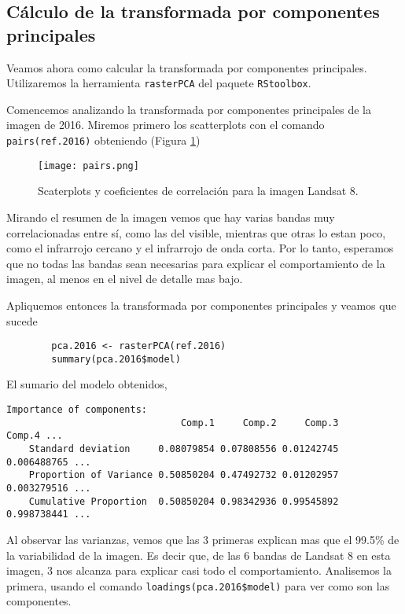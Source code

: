 \subsection{C\'alculo de la transformada por componentes principales}

Veamos ahora como calcular la transformada por componentes principales. Utilizaremos la
herramienta \texttt{rasterPCA} del paquete \texttt{RStoolbox}.

\begin{exa}
    Comencemos analizando la transformada por componentes principales de la
    imagen de 2016. Miremos primero los scatterplots con el comando \texttt{pairs(ref.2016)}
    obteniendo (Figura \ref{fig:pairs2})
    \begin{figure}[h!]
    \begin{center}
        \texttt{[image: pairs.png]}
    \end{center}
    \caption{Scaterplots y coeficientes de correlaci\'on para la imagen Landsat 8.}
    \label{fig:pairs2}
    \end{figure}

    Mirando el resumen de la imagen vemos que hay varias bandas muy
    correlacionadas entre s\'i, como las del visible, mientras que otras lo
    estan poco, como el infrarrojo cercano y el infrarrojo de onda corta. Por lo tanto, esperamos que no
    todas las bandas sean necesarias para explicar el comportamiento de la
    imagen, al menos en el nivel de detalle mas bajo.

    Apliquemos entonces la transformada por componentes principales y veamos que
    sucede

    \begin{lstlisting}
        pca.2016 <- rasterPCA(ref.2016)
        summary(pca.2016$model)
    \end{lstlisting}

    El sumario del modelo obtenidos,
    \begin{Verbatim}[fontsize=\small]
    Importance of components:
                               Comp.1     Comp.2     Comp.3      Comp.4 ...
    Standard deviation     0.08079854 0.07808556 0.01242745 0.006488765 ...
    Proportion of Variance 0.50850204 0.47492732 0.01202957 0.003279516 ...
    Cumulative Proportion  0.50850204 0.98342936 0.99545892 0.998738441 ...
    \end{Verbatim}

    Al observar las varianzas, vemos que las 3 primeras explican mas que el
    99.5\% de la variabilidad de la imagen. Es decir que, de las 6 bandas de
    Landsat 8 en esta imagen, 3 nos alcanza para explicar casi todo el
    comportamiento. Analisemos la primera, usando el comando
    \texttt{loadings(pca.2016\$model)} para ver como son las componentes.


\end{exa}
